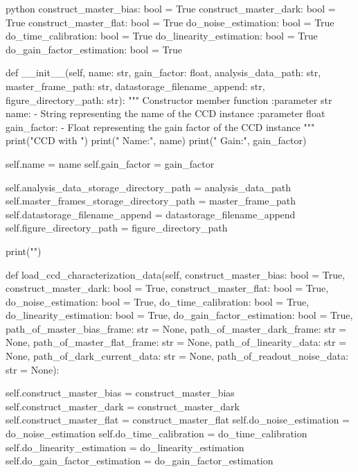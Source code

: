 \documentclass[../main.tex]{subfiles}
\begin{document}
\begin{mintedbox}{python}
construct_master_bias: bool  =  True
construct_master_dark: bool  =  True
construct_master_flat: bool  =  True
do_noise_estimation: bool  =  True
do_time_calibration: bool  =  True
do_linearity_estimation: bool  =  True
do_gain_factor_estimation: bool  =  True

def __init__(self, name: str, gain_factor: float, analysis_data_path: str, master_frame_path: str,
datastorage_filename_append: str, figure_directory_path: str):
"""
Constructor member function
:parameter str name:
- String representing the name of the CCD instance
:parameter float gain_factor:
- Float representing the gain factor of the CCD instance
"""
print("\nInitiallizing CCD with ")
print(" Name:", name)
print(" Gain:", gain_factor)

self.name  =  name
self.gain_factor  =  gain_factor

self.analysis_data_storage_directory_path  =  analysis_data_path
self.master_frames_storage_directory_path  =  master_frame_path
self.datastorage_filename_append  =  datastorage_filename_append
self.figure_directory_path  =  figure_directory_path

print("")

def load_ccd_characterization_data(self,
construct_master_bias: bool  =  True,
construct_master_dark: bool  =  True,
construct_master_flat: bool  =  True,
do_noise_estimation: bool  =  True,
do_time_calibration: bool  =  True,
do_linearity_estimation: bool  =  True,
do_gain_factor_estimation: bool  =  True,
path_of_master_bias_frame: str  =  None,
path_of_master_dark_frame: str  =  None,
path_of_master_flat_frame: str  =  None,
path_of_linearity_data: str  =  None,
path_of_dark_current_data: str  =  None,
path_of_readout_noise_data: str  =  None):

self.construct_master_bias  =  construct_master_bias
self.construct_master_dark  =  construct_master_dark
self.construct_master_flat  =  construct_master_flat
self.do_noise_estimation  =  do_noise_estimation
self.do_time_calibration  =  do_time_calibration
self.do_linearity_estimation  =  do_linearity_estimation
self.do_gain_factor_estimation  =  do_gain_factor_estimation


\end{mintedbox}
\end{document}
